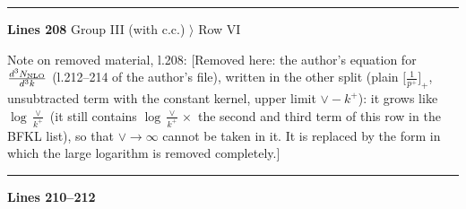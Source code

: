 \documentclass[10pt]{article}
\newenvironment{notebox}{\def\FrameCommand{{\color{notebar}\vrule width 1.5pt}\hspace{6pt}}\MakeFramed{\advance\hsize-\width\FrameRestore}\small}{\endMakeFramed}
\begin{document}
\noindent\rule{\linewidth}{0.3pt}\par\noindent\textbf{Lines 208} \quad \textsf{Group III (with c.c.) $\rangle$ Row VI}\par
\begin{notebox}\textsf{\small Note on removed material, l.208:} [Removed here: the author's equation for $\frac{d^{3}N_{\rm NLO}}{d^{3}k}$ (l.212--214 of the author's file), written in the other split (plain $\big[\frac{1}{p^{+}}\big]_{+}$, unsubtracted term with the constant kernel, upper limit $\vee-k^{+}$): it grows like $\log\frac{\vee}{k^{+}}$ (it still contains $\log\frac{\vee}{k^{+}}\times$ the second and third term of this row in the BFKL list), so that $\vee\to\infty$ cannot be taken in it. It is replaced by the form in which the large logarithm is removed completely.]\end{notebox}
\noindent\rule{\linewidth}{0.3pt}\par\noindent\textbf{Lines 210--212} \par
\end{document}
